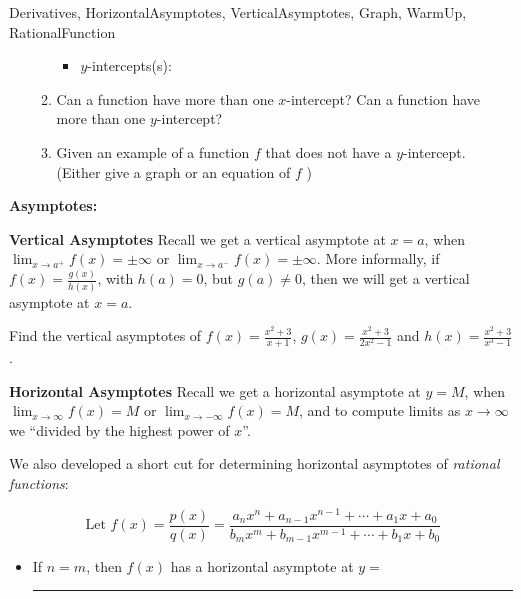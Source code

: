 \begin{tagblock}{Derivatives, HorizontalAsymptotes, VerticalAsymptotes, Graph, WarmUp, RationalFunction  }
\begin{question}
\begin{enumerate}
\begin{enumerate}
\begin{itemize}
\item $y$-intercepts(s):

\vspace{.5in}

\end{itemize}
\item Can a function have more than one $x$-intercept?  Can a function have more than one $y$-intercept?  

\vspace{.5in}

\item Given an example of a function $f$ that does not have a $y$-intercept.  (Either give a graph or an equation of  $f$ )


\vspace{.5in}


\end{enumerate}
\end{enumerate}

\newpage
\textbf{Asymptotes:}


 \textbf{Vertical Asymptotes}  Recall we get a vertical asymptote at $x=a$, when $\lim_{x \to a^+} f(x) = \pm \infty$ or $\lim_{x \to a^-} f(x) = \pm \infty$.  More informally, if $f(x) = \frac{g(x)}{h(x)}$, with $h(a)=0$, but $g(a) \neq 0$, then we will get a vertical asymptote at $x=a$.

\bigskip

Find the vertical asymptotes of $\displaystyle f(x) = \frac{x^2+3}{x+1}$,  $\displaystyle g(x) = \frac{x^2+3}{2x^2 - 1}$ and $\displaystyle h(x) = \frac{x^2+3}{x^3-1}$.  

\vspace{1in}

\bigskip

 \textbf{Horizontal Asymptotes}  Recall we get a horizontal asymptote at $y=M$, when $\lim_{x \to \infty} f(x) = M$ or $\lim_{x \to -\infty} f(x) = M$, and to compute limits as $x \to \infty$ we ``divided by the highest power of $x$''.  

We also developed a short cut for determining horizontal asymptotes of \emph{rational functions}:

\[\text{ Let } f(x) = \frac{p(x)}{q(x)} = \frac{a_nx^n + a_{n-1}x^{n-1} + \cdots + a_1x+a_0}{b_mx^m + b_{m-1}x^{m-1} + \cdots + b_1x+b_0}\]
\bigskip

\begin{itemize}
\item If $n=m$, then $f(x)$ has a horizontal asymptote at $y =$ \rule{5cm}{0.1mm} 


\end{itemize}
\end{question}
\end{tagblock}
